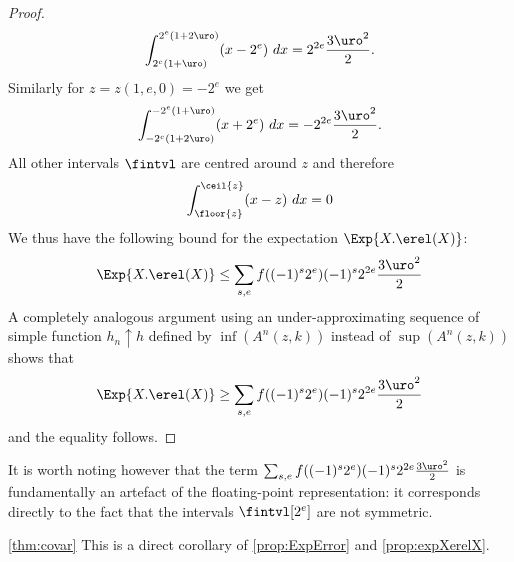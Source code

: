 \begin{proof}
\[
\int_{2^e(1+\uro)}^{2^e(1+2\uro)} (x-2^e)~dx = 2^{2e}\frac{3\uro^2}{2}.
\]
Similarly for $z=z(1,e,0)=-2^e$ we get
\[
\int^{-2^e(1+\uro)}_{-2^e(1+2\uro)} (x+2^e)~dx = -2^{2e}\frac{3\uro^2}{2}.
\]
All other intervals $\fintvl$ are centred around $z$ and therefore
\[
\int_{\floor{z}}^{\ceil{z}} (x-z)~dx = 0
\]
We thus have the following bound for the expectation $\Exp{X.\erel(X)}$:
\[
\Exp{X.\erel(X)}\leq \sum_{s,e} f((-1)^s2^e)(-1)^s2^{2e}\frac{3\uro^2}{2}
\]
A completely analogous argument using an under-approximating sequence of simple function $h_n\uparrow h$ defined by $\inf(A^n(z,k))$ instead of $\sup(A^n(z,k))$ shows that
\[
\Exp{X.\erel(X)}\geq \sum_{s,e} f((-1)^s2^e)(-1)^s2^{2e}\frac{3\uro^2}{2}
\]
and the equality follows.
\flushright{$\square$}
\end{proof}

It is worth noting however that the term  $\sum_{s,e} f((-1)^s2^e)(-1)^s2^{2e}\frac{3\uro^2}{2}$ is fundamentally an artefact of the floating-point representation: it corresponds directly to the fact that the intervals $\fintvl[2^e]$ are not symmetric.

\begin{myproof}{\cref{thm:covar}}
This is a direct corollary of \cref{prop:ExpError} and \cref{prop:expXerelX}.
\end{myproof}

